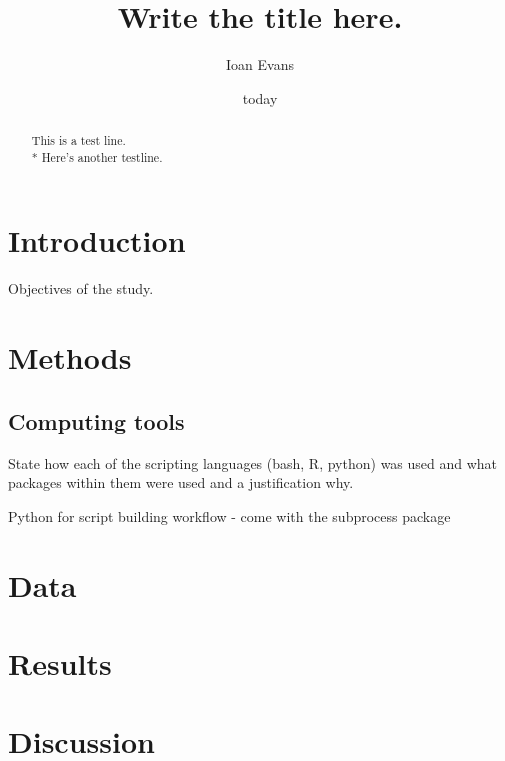 \documentclass[11pt]{article}
\title{Write the title here.}
\author{Ioan Evans}
\affil{Department of Life Sciences, Imperial College London}
\date{today}
\begin{document}
    \maketitle

\newpage
\linenumbers

    \begin{abstract}
    This is a test line. \\*
    Here's another testline.
        
    \end{abstract}

    \section{Introduction}
    Objectives of the study.

    \section{Methods}

        \subsection{Computing tools}
        State how each of the scripting languages (bash, R, python) was used
        and what packages within them were used and a justification why.


            Python for script building workflow - come with the subprocess package

    \section{Data}

    \section{Results}
        
    \section{Discussion}
        
\end{document}
